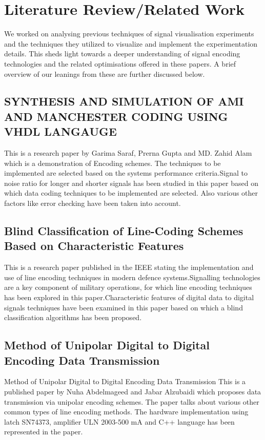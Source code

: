 \documentclass[10pt,journal,compsoc]{IEEEtran}
\begin{document}
\section{Literature Review/Related Work}
We worked on analysing previous techniques of signal visualisation experiments and the techniques they utilized to visualize and implement the experimentation details. This sheds light towards a deeper understanding of signal encoding technologies and the related optimisations offered in these papers. A brief overview of our leanings from these are further discussed below.

\subsection{SYNTHESIS AND SIMULATION OF AMI AND MANCHESTER CODING USING VHDL LANGAUGE}
This is a research paper by Garima Saraf, Prerna Gupta and MD. Zahid Alam which is a demonstration of Encoding schemes. The techniques to be implemented are selected based on the systems performance criteria.Signal to noise ratio for longer and shorter signals has been studied in this paper based on which data coding techniques to be implemented are selected. Also various other factors like error checking have been taken into account.

\subsection{Blind Classification of Line-Coding Schemes Based on Characteristic Features}
This is a research paper published in the IEEE stating the implementation and use of line encoding techniques in modern defence systems.Signalling technologies are a key component of military operations, for which line encoding techniques has been explored in this paper.Characteristic features of digital data to digital signals techniques have been examined in this paper based on which a blind classification algorithms has been proposed.   

\subsection{Method of Unipolar Digital to Digital Encoding Data Transmission}
Method of Unipolar Digital to Digital Encoding Data Transmission
This is a published paper by Nuha Abdelmageed and Jabar Alzubaidi which proposes data transmission  via unipolar encoding schemes. The paper talks about various other common types of line encoding methods. The hardware implementation using latch SN74373, amplifier  ULN 2003-500 mA and C++ language has been represented in the paper.  
\end{document}

